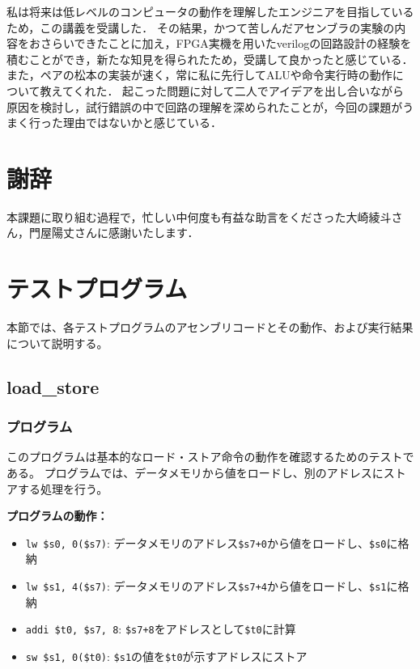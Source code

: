 \documentclass[dvipdfmx]{jsarticle}
\begin{document}
私は将来は低レベルのコンピュータの動作を理解したエンジニアを目指しているため，この講義を受講した．
その結果，かつて苦しんだアセンブラの実験の内容をおさらいできたことに加え，FPGA実機を用いたverilogの回路設計の経験を積むことができ，新たな知見を得られたため，受講して良かったと感じている．
また，ペアの松本の実装が速く，常に私に先行してALUや命令実行時の動作について教えてくれた．
起こった問題に対して二人でアイデアを出し合いながら原因を検討し，試行錯誤の中で回路の理解を深められたことが，今回の課題がうまく行った理由ではないかと感じている．

\section*{謝辞}
本課題に取り組む過程で，忙しい中何度も有益な助言をくださった大崎綾斗さん，門屋陽丈さんに感謝いたします．

\appendix
\section{テストプログラム}

本節では、各テストプログラムのアセンブリコードとその動作、および実行結果について説明する。

\subsection{load\_store}
\label{appendix:load_store}

\subsubsection{プログラム}
このプログラムは基本的なロード・ストア命令の動作を確認するためのテストである。
プログラムでは、データメモリから値をロードし、別のアドレスにストアする処理を行う。



\textbf{プログラムの動作：}
\begin{itemize}
\item \texttt{lw \$s0, 0(\$s7)}: データメモリのアドレス\texttt{\$s7+0}から値をロードし、\texttt{\$s0}に格納
\item \texttt{lw \$s1, 4(\$s7)}: データメモリのアドレス\texttt{\$s7+4}から値をロードし、\texttt{\$s1}に格納  
\item \texttt{addi \$t0, \$s7, 8}: \texttt{\$s7+8}をアドレスとして\texttt{\$t0}に計算
\item \texttt{sw \$s1, 0(\$t0)}: \texttt{\$s1}の値を\texttt{\$t0}が示すアドレスにストア
\end{itemize}
\end{document}
